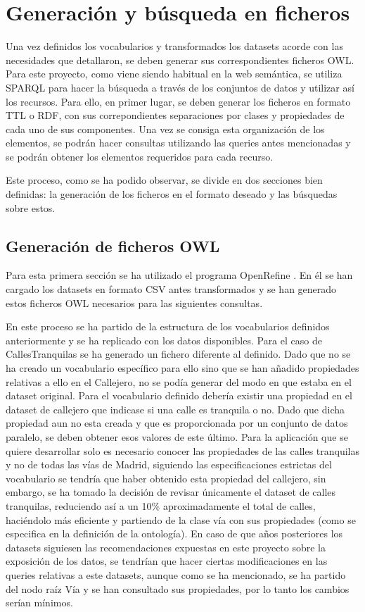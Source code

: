 \chapter{Generación y búsqueda en ficheros}

Una vez definidos los vocabularios y transformados los datasets acorde con las necesidades que detallaron, se deben generar sus correspondientes ficheros OWL.
Para este proyecto, como viene siendo habitual en la web semántica, se utiliza SPARQL para hacer la búsqueda a través de los conjuntos de datos y utilizar así los recursos. Para ello, en primer lugar, se deben generar los ficheros en formato TTL o RDF, con sus correpondientes separaciones por clases y propiedades de cada uno de sus componentes. Una vez se consiga esta organización de los elementos, se podrán hacer consultas utilizando las queries antes mencionadas y se podrán obtener los elementos requeridos para cada recurso.

Este proceso, como se ha podido observar, se divide en dos secciones bien definidas: la generación de los ficheros en el formato deseado y las búsquedas sobre estos.


\section{Generación de ficheros OWL}

Para esta primera sección se ha utilizado el programa OpenRefine \cite{pagPrinc_OpenRefine}. En él se han cargado los datasets en formato CSV antes transformados y se han generado estos ficheros OWL necesarios para las siguientes consultas.

En este proceso se ha partido de la estructura de los vocabularios definidos anteriormente y se ha replicado con los datos disponibles. 
Para el caso de CallesTranquilas se ha generado un fichero diferente al definido. Dado que no se ha creado un vocabulario específico para ello sino que se han añadido propiedades relativas a ello en el Callejero, no se podía generar del modo en que estaba en el dataset original. Para el vocabulario definido debería existir una propiedad en el dataset de callejero que indicase si una calle es tranquila o no. Dado que dicha propiedad aun no esta creada y que es proporcionada por un conjunto de datos paralelo, se deben obtener esos valores de este último. Para la aplicación que se quiere desarrollar solo es necesario conocer las propiedades de las calles tranquilas y no de todas las vías de Madrid, siguiendo las especificaciones estrictas del vocabulario se tendría que haber obtenido esta propiedad del callejero, sin embargo, se ha tomado la decisión de revisar únicamente el dataset de calles tranquilas, reduciendo así a un 10$\%$ aproximadamente el total de calles, haciéndolo más eficiente y partiendo de la clase vía con sus propiedades (como se especifica en la definición de la ontología). En caso de que años posteriores los datasets siguiesen las recomendaciones expuestas en este proyecto sobre la exposición de los datos, se tendrían que hacer ciertas modificaciones en las queries relativas a este datasets, aunque como se ha mencionado, se ha partido del nodo raíz Vía y se han consultado sus propiedades, por lo tanto los cambios serían mínimos.

